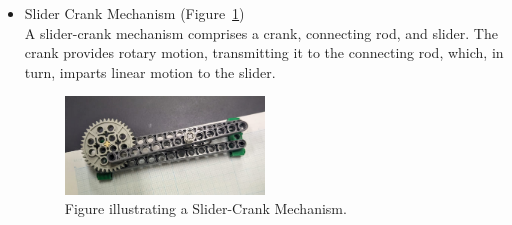 \documentclass[12pt,a4paper]{report}
\begin{document}
\begin{itemize}
    \item Slider Crank Mechanism (Figure~\ref{fig:ass14-1})\\
    A slider-crank mechanism comprises a crank, connecting rod, and slider. The crank provides rotary motion, 
    transmitting it to the connecting rod, which, in turn, imparts linear motion to the slider.
    \begin{figure}[htbp]
        \centering
        \includegraphics[width=0.5\textwidth]{figures/ass14-1}
        \caption{Figure illustrating a Slider-Crank Mechanism.}
        \label{fig:ass14-1}
    \end{figure}
\end{itemize}
\end{document}

